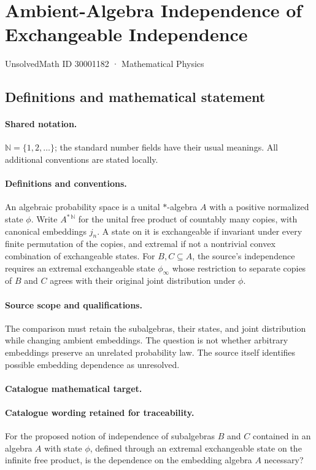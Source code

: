 \documentclass[11pt]{article}
\begin{document}
\setcounter{section}{30001181}
\section{Ambient-Algebra Independence of Exchangeable Independence}\label{30001182}
{\small UnsolvedMath ID 30001182 · Mathematical Physics}
\subsection{Definitions and mathematical statement}

\paragraph{Shared notation.}$\mathbb N=\{1,2,\ldots\}$; the standard number fields have their usual meanings. All additional conventions are stated locally.


\paragraph{Definitions and conventions.} An algebraic probability space is a unital $*$-algebra $A$ with a positive normalized state $\phi$. Write $A^{*\,\mathbb N}$ for the unital free product of countably many copies, with canonical embeddings $j_n$. A state on it is exchangeable if invariant under every finite permutation of the copies, and extremal if not a nontrivial convex combination of exchangeable states. For $B,C\subseteq A$, the source's independence requires an extremal exchangeable state $\phi_\infty$ whose restriction to separate copies of $B$ and $C$ agrees with their original joint distribution under $\phi$.

\paragraph{Source scope and qualifications.} The comparison must retain the subalgebras, their states, and joint distribution while changing ambient embeddings. The question is not whether arbitrary embeddings preserve an unrelated probability law. The source itself identifies possible embedding dependence as unresolved.

\paragraph{Catalogue mathematical target.}
\paragraph{Catalogue wording retained for traceability.}
For the proposed notion of independence of subalgebras $B$ and $C$ contained in an algebra $A$ with state $\phi$, defined through an extremal exchangeable state on the infinite free product, is the dependence on the embedding algebra $A$ necessary?
\end{document}
